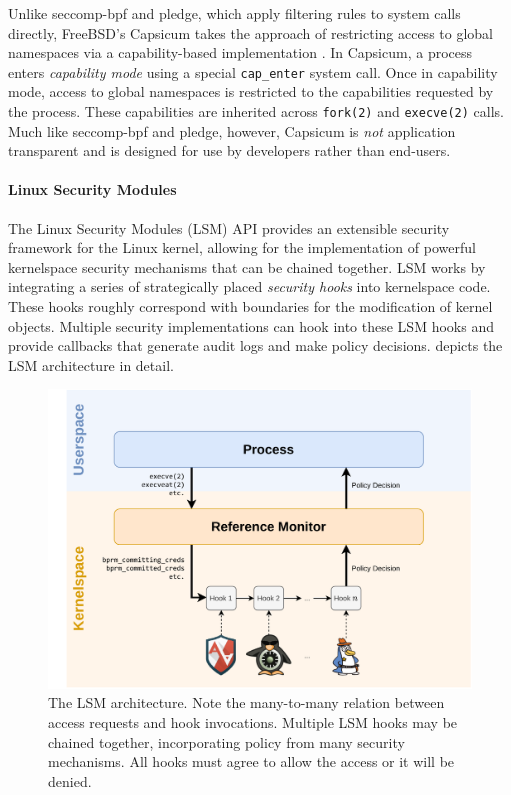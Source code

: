 \documentclass[dvipsnames, 12pt]{article}
\begin{document}
Unlike seccomp-bpf and pledge, which apply filtering rules to system calls
directly, FreeBSD's Capsicum takes the approach of restricting access to global
namespaces via a capability-based implementation \cite{watson2010_capsicum}. In
Capsicum, a process enters \textit{capability mode}  using a special
\texttt{cap\_enter} system call. Once in capability mode, access to global
namespaces is restricted to the capabilities requested by the process. These
capabilities are inherited across \texttt{fork(2)} and \texttt{execve(2)} calls.
Much like seccomp-bpf and pledge, however, Capsicum is \textit{not} application
transparent and is designed for use by developers rather than end-users.

\paragraph*{Linux Security Modules}

The Linux Security Modules (LSM) API \cite{wright2002_lsm} provides an
extensible security framework for the Linux kernel, allowing for the
implementation of powerful kernelspace security mechanisms that can be chained
together. LSM works by integrating a series of strategically placed
\textit{security hooks} into kernelspace code. These hooks roughly correspond
with boundaries for the modification of kernel objects. Multiple security
implementations can hook into these LSM hooks and provide callbacks that
generate audit logs and make policy decisions.   depicts the LSM
architecture in detail.

\begin{figure}[htpb]
    \centering
    \includegraphics[width=0.8\linewidth]{figs/lsm.pdf}
    \caption{The LSM architecture. Note the many-to-many relation between access
    requests and hook invocations. Multiple LSM hooks may be chained together,
    incorporating policy from many security mechanisms. All hooks must agree to
    allow the access or it will be denied.}%
    \label{fig:lsm}
\end{figure}
\end{document}
